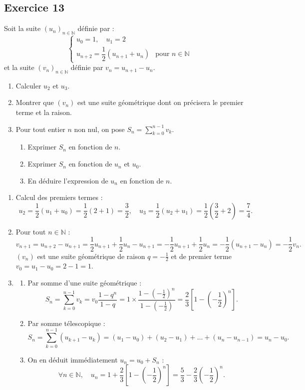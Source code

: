 \documentclass[11pt,a4paper]{article}
\newcommand{\N}{\mathbb{N}}
\begin{document}
\subsection*{Exercice 13}
Soit la suite $(u_n)_{n \in \N}$ définie par :
\[
\begin{cases}
u_0 = 1, \quad u_1 = 2\\
u_{n+2} = \dfrac{1}{2}(u_{n+1} + u_n) & \text{pour } n \in \N
\end{cases}
\]
et la suite $(v_n)_{n \in \N}$ définie par $v_n = u_{n+1} - u_n$.
\begin{enumerate}
    \item Calculer $u_2$ et $u_3$.
    \item Montrer que $(v_n)$ est une suite géométrique dont on précisera le premier terme et la raison.
    \item Pour tout entier $n$ non nul, on pose $S_n = \sum_{k=0}^{n-1} v_k$.
    \begin{enumerate}
        \item Exprimer $S_n$ en fonction de $n$.
        \item Exprimer $S_n$ en fonction de $u_n$ et $u_0$.
        \item En déduire l'expression de $u_n$ en fonction de $n$.
    \end{enumerate}
\end{enumerate}

\begin{correctionbox}
\begin{enumerate}
    \item Calcul des premiers termes :
    \[
    u_2 = \frac{1}{2}(u_1 + u_0) = \frac{1}{2}(2 + 1) = \frac{3}{2}, \quad u_3 = \frac{1}{2}(u_2 + u_1) = \frac{1}{2}\left(\frac{3}{2} + 2\right) = \frac{7}{4}.
    \]
    \item Pour tout $n \in \N$ :
    \[
    v_{n+1} = u_{n+2} - u_{n+1} = \frac{1}{2}u_{n+1} + \frac{1}{2}u_n - u_{n+1} = -\frac{1}{2}u_{n+1} + \frac{1}{2}u_n = -\frac{1}{2}(u_{n+1} - u_n) = -\frac{1}{2}v_n.
    \]
    $(v_n)$ est une suite géométrique de raison $q = -\frac{1}{2}$ et de premier terme $v_0 = u_1 - u_0 = 2 - 1 = 1$.
    \item
    \begin{enumerate}
        \item Par somme d'une suite géométrique :
        \[
        S_n = \sum_{k=0}^{n-1} v_k = v_0 \frac{1 - q^n}{1 - q} = 1 \times \frac{1 - \left(-\frac{1}{2}\right)^n}{1 - \left(-\frac{1}{2}\right)} = \frac{2}{3}\left[1 - \left(-\frac{1}{2}\right)^n\right].
        \]
        \item Par somme télescopique :
        \[
        S_n = \sum_{k=0}^{n-1} (u_{k+1} - u_k) = (u_1 - u_0) + (u_2 - u_1) + \dots + (u_n - u_{n-1}) = u_n - u_0.
        \]
        \item On en déduit immédiatement $u_n = u_0 + S_n$ :
        \[
        \forall n \in \N, \quad u_n = 1 + \frac{2}{3}\left[1 - \left(-\frac{1}{2}\right)^n\right] = \frac{5}{3} - \frac{2}{3}\left(-\frac{1}{2}\right)^n.
        \]
    \end{enumerate}
\end{enumerate}
\end{correctionbox}
\end{document}
